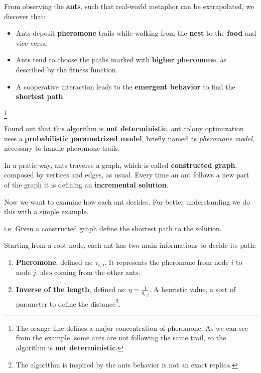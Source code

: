 From observing the \textbf{ants}, such that real-world metaphor can be extrapolated, we discover that:
\begin{itemize}[nosep]
    \renewcommand{\labelitemi}{-}
    \item Ants deposit \textbf{pheromone} trails while walking from the \textbf{nest} to the \textbf{food} and vice versa.
    \item Ants tend to choose the paths marked with \textbf{higher pheromone}, as described by the fitness function.
    \item A cooperative interaction leads to the \textbf{emergent behavior} to find the \textbf{shortest path}.
\end{itemize} \vspace{3.5pt}
\begin{center}
    \footnote{The orange line defines a major concentration of pheromone. As we can see from the example, some ants are not following the same trail, so the algorithm is \textbf{not deterministic}.}
\end{center} \vspace{3.5pt}

Found out that this algorithm is \textbf{not deterministic}, ant colony optimization uses a \textbf{probabilistic parametrized model}, briefly named as \textit{pheromone model},
necessary to handle pheromone trails. \vspace{3.5pt}

In a pratic way, ants traverse a graph, which is called \textbf{constructed graph}, composed by vertices and edges, as usual. Every time an ant follows a new part of the graph
it is defining an \textbf{incremental solution}. \vspace{3.5pt}

Now we want to examine how each ant decides. For better understanding we do this with a simple example.
\begin{example}
    i.e. Given a constructed graph define the shortest path to the solution. \vspace{3.5pt}
    \begin{center}
    \end{center} \vspace{3.5pt}

    Starting from a root node, each ant has two main informations to decide its path:
    \begin{enumerate}[nosep]
        \item \textbf{Pheromone}, defined as: $\tau_{i,j}$. It represents the pheromone from node $i$ to node $j$, also coming from the other ants.
        \item  \textbf{Inverse of the length}, defined as: $\eta = \frac{1}{d_{i, j}}$. A heuristic value, a sort of parameter to define the distance\footnote{The algorithm is inspired by the ants behavior is not an exact replica.}.
    \end{enumerate} \vspace{3.5pt}
\end{example}